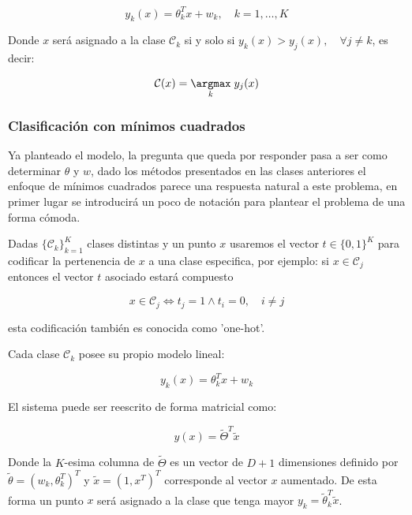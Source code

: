\begin{equation}
	y_k(x) = \theta_k^Tx + w_k, \quad k=1,\ldots,K
\end{equation}

Donde $x$ será asignado a la clase $\mathcal{C}_k$ si y solo si $y_k(x) > y_j(x),\quad \forall j\neq k$, es decir:

\begin{equation}
	\mathcal{C}(x) = \underset{k}{\argmax}\hspace{1mm} y_j(x)
\end{equation}

\subsubsection{Clasificación con mínimos cuadrados}

Ya planteado el modelo, la pregunta que queda por responder pasa a ser como determinar $\theta$ y $w$, dado los métodos presentados en las clases anteriores el enfoque de mínimos cuadrados parece una respuesta natural a este problema, en primer lugar se introducirá un poco de notación para plantear el problema de una forma cómoda.

Dadas $\{\mathcal{C}_k\}_{k=1}^K$ clases distintas y un punto $x$ usaremos el vector $t\in\{0,1\}^K$ para codificar la pertenencia de $x$ a una clase especifica, por ejemplo: si $x\in\mathcal{C}_j$ entonces el vector $t$ asociado estará compuesto 

\begin{equation}
	x\in\mathcal{C}_j \Leftrightarrow t_j=1 \wedge t_i=0, \quad i\neq j
\end{equation}

esta codificación también es conocida como 'one-hot'.

Cada clase $\mathcal{C}_k$ posee su propio modelo lineal:

\begin{equation}
	y_k(x) = \theta_k^Tx + w_k \nonumber
\end{equation}

El sistema puede ser reescrito de forma matricial como:

\begin{equation}
	y(x) = \tilde{\Theta}^T\tilde{x}
\end{equation}

Donde la $K$-esima columna de $\tilde{\Theta}$ es un vector de $D+1$ dimensiones definido por $\tilde{\theta}=(w_k, \theta_k^T)^T$ y $\tilde{x}=(1,x^T)^T$ corresponde al vector $x$ aumentado. De esta forma un punto $x$ será asignado a la clase que tenga mayor $y_k=\tilde{\theta}_k^T\tilde{x}$.

